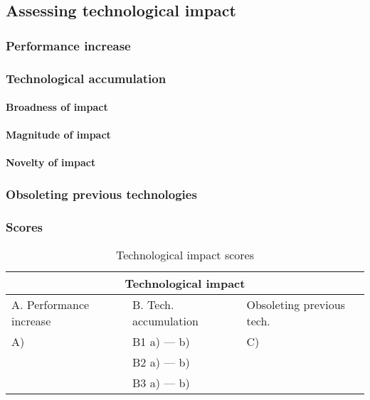 \subsection{Assessing technological impact}
\subsubsection{Performance increase}

\subsubsection{Technological accumulation}
\paragraph{Broadness of impact}

\paragraph{Magnitude of impact}

\paragraph{Novelty of impact}

\subsubsection{Obsoleting previous technologies}

\subsubsection{Scores}
\begin{table}[h]
\centering
\begin{tabular}{l l l}
\hline
\multicolumn{3}{|c|}{Technological impact} \\
\hline
A. Performance increase & B. Tech. accumulation & Obsoleting previous tech.\\
A)   & B1 a)  --- b)  & C) \\ 
     & B2 a)  --- b)  & \\
     & B3 a)  --- b)  & \\
\hline
\end{tabular}
\caption{Technological impact scores}
\label{tbl:impactscores4}
\end{table}